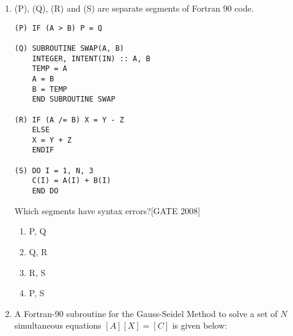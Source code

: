\documentclass[journal,12pt,onecolumn]{IEEEtran}
\theoremstyle{remark}
\begin{document}
\begin{enumerate}
The result displayed by the program is:\hfill{[GATE 2008]}

\begin{multicols}{4}
\begin{enumerate}
    \item 1 \\
          5 \\
          7
          \columnbreak
    \item 1 \\
          3 \\
          5
\columnbreak    \item 1 \\
          3 \\
          7
\columnbreak    \item 3 \\
          5 \\
          7
\end{enumerate}
\end{multicols}

\item (P), (Q), (R) and (S) are separate segments of Fortran 90 code.
\begin{center}
    \begin{verbatim}
(P) IF (A > B) P = Q

(Q) SUBROUTINE SWAP(A, B)
    INTEGER, INTENT(IN) :: A, B
    TEMP = A
    A = B
    B = TEMP
    END SUBROUTINE SWAP

(R) IF (A /= B) X = Y - Z
    ELSE
    X = Y + Z
    ENDIF

(S) DO I = 1, N, 3
    C(I) = A(I) + B(I)
    END DO
   \end{verbatim}
  
\end{center}
    




Which segments have syntax errors?\hfill{[GATE 2008]}
\begin{multicols}{4}
\begin{enumerate}
    \item P, Q
    \item Q, R
    \item R, S
    \item P, S
\end{enumerate}
\end{multicols}
    
     \item A Fortran-90 subroutine for the Gauss-Seidel Method to solve a set of \( N \) simultaneous equations \([A][X]=[C]\) is given below:


\end{enumerate}
\end{document}
